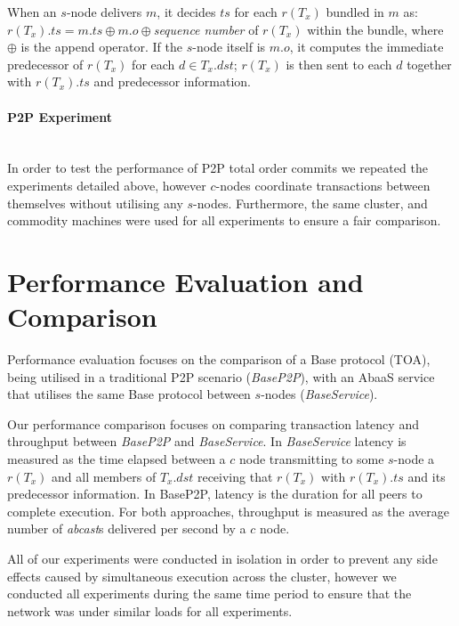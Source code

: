 When an $s$-node delivers $m$, it decides $ts$ for each $r(T_x)$ bundled in $m$ as: $r(T_x).ts= m.ts\oplus m.o \oplus$\emph{sequence number} of $r(T_x)$ within the bundle, where $\oplus$ is the append operator. If the $s$-node itself is $m.o$, it computes the immediate predecessor of $r(T_x)$ for each $d \in T_x.dst$; $r(T_x)$ is then sent to each $d$ together with $r(T_x).ts$ and predecessor information.

\paragraph{P2P Experiment} \hspace{0pt} \\
In order to test the performance of P2P total order commits we repeated the  experiments detailed above, however $c$-nodes coordinate transactions between themselves without utilising any $s$-nodes.  Furthermore, the same cluster, and commodity machines were used for all experiments to ensure a fair comparison.   

\section{Performance Evaluation and Comparison}\label{sec:abaas_results}
Performance evaluation focuses on the comparison of a \textsf{Base} protocol (TOA), being utilised in a traditional P2P scenario (\emph{BaseP2P}), with an \textsf{AbaaS} service that utilises the same \textsf{Base} protocol between $s$-nodes (\emph{BaseService}).

Our performance comparison focuses on comparing transaction latency and throughput between \emph{BaseP2P} and \emph{BaseService}.  In \emph{BaseService} latency is measured as the time elapsed between a $c$ node transmitting to some $s$-node a $r(T_x)$  and all members of $T_x.dst$ receiving that $r(T_x)$ with $r(T_x).ts$ and its predecessor information. In BaseP2P, latency is the duration for all peers to complete execution. For both approaches, throughput is measured as the average number of \emph{abcast}s delivered per second by a $c$ node.

All of our experiments were conducted in isolation in order to prevent any side effects caused by simultaneous execution across the cluster, however we conducted all experiments during the same time period to ensure that the network was under similar loads for all experiments. 

